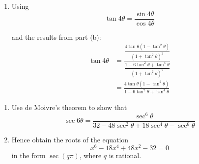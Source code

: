 \documentclass[leqno]{article}
\begin{document}
\begin{enumerate}[
  label=\textbf{\arabic*.},
  leftmargin=*,
  topsep=0pt,
  partopsep=0pt,
  parsep=0pt
]
\begin{djsSolution}
\begin{enumerate}[label=\textbf{(\alph*)}]
  From part (a):
  \[
  (1+it)^4=\frac{\cos4\theta+i\sin4\theta}{\cos^4\theta}
  \]

  Equating real and imaginary parts gives
  \[
  \frac{\cos4\theta}{\cos^4\theta}=1-6t^2+t^4
  \qquad\text{and}\qquad
  \frac{\sin4\theta}{\cos^4\theta}=4t(1-t^2)
  \]

  Now
  \[
  1+\tan^2\theta=\sec^2\theta=\frac{1}{\cos^2\theta}
  \]

  so
  \[
  \cos^4\theta=\frac{1}{(1+\tan^2\theta)^2}=\frac{1}{(1+t^2)^2}
  \]

  Therefore
  \begin{align*}
  \cos4\theta
  &=(1-6t^2+t^4)\cos^4\theta \\
  &=\frac{1-6t^2+t^4}{(1+t^2)^2}
  \end{align*}

  and
  \begin{align*}
  \sin4\theta
  &=4t(1-t^2)\cos^4\theta \\
  &=\frac{4t(1-t^2)}{(1+t^2)^2}
  \end{align*}

  Replacing $t$ by $\tan\theta$ gives
  \[
  \cos4\theta=\frac{1-6\tan^2\theta+\tan^4\theta}{(1+\tan^2\theta)^2}
  \]

  and
  \[
  \sin4\theta=\frac{4\tan\theta(1-\tan^2\theta)}{(1+\tan^2\theta)^2}
  \]

  \item Using
  \[
  \tan4\theta=\frac{\sin4\theta}{\cos4\theta}
  \]

  and the results from part (b):
  \begin{align*}
  \tan4\theta
  &=\frac{\dfrac{4\tan\theta(1-\tan^2\theta)}{(1+\tan^2\theta)^2}}
  {\dfrac{1-6\tan^2\theta+\tan^4\theta}{(1+\tan^2\theta)^2}} \\
  &=\frac{4\tan\theta(1-\tan^2\theta)}{1-6\tan^2\theta+\tan^4\theta}
  \end{align*}
\end{enumerate}
\end{djsSolution}


\newpage

\questionitem

\begin{enumerate}[label=\textbf{(\alph*)}]
  \item Use de Moivre's theorem to show that
  \[
  \sec 6\theta = \frac{\sec^6 \theta}{32 - 48\sec^2 \theta + 18\sec^4 \theta - \sec^6 \theta}
  \]
  \item Hence obtain the roots of the equation
  \[
  x^6 - 18x^4 + 48x^2 - 32 = 0
  \]
  in the form $\sec(q\pi)$, where $q$ is rational.  \\
\end{enumerate}


\end{enumerate}
\end{document}
